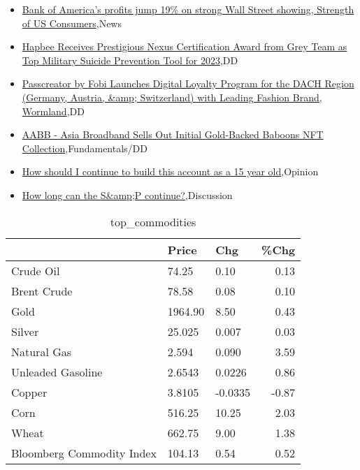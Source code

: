 \documentclass{article}%
\begin{document}
%
\begin{itemize}%
\item%
\href{https://reddit.com/r/wallstreetbets/comments/152vpia/bank\_of\_americas\_profits\_jump\_19\_on\_strong\_wall/}{Bank of America's profits jump 19\% on strong Wall Street showing, Strength of US Consumers},News%
\item%
\href{https://reddit.com/r/Baystreetbets/comments/1527l7h/hapbee\_receives\_prestigious\_nexus\_certification/}{Hapbee Receives Prestigious Nexus Certification Award from Grey Team as Top Military Suicide Prevention Tool for 2023},DD%
\item%
\href{https://reddit.com/r/Baystreetbets/comments/1523cgd/passcreator\_by\_fobi\_launches\_digital\_loyalty/}{Passcreator by Fobi Launches Digital Loyalty Program for the DACH Region (Germany, Austria, \&amp; Switzerland) with Leading Fashion Brand, Wormland},DD%
\item%
\href{https://reddit.com/r/StockMarket/comments/152x7kb/aabb\_asia\_broadband\_sells\_out\_initial\_goldbacked/}{AABB - Asia Broadband Sells Out Initial Gold-Backed Baboons NFT Collection},Fundamentals/DD%
\item%
\href{https://reddit.com/r/StockMarket/comments/152nt8v/how\_should\_i\_continue\_to\_build\_this\_account\_as\_a/}{How should I continue to build this account as a 15 year old},Opinion%
\item%
\href{https://reddit.com/r/StockMarket/comments/152lurx/how\_long\_can\_the\_sp\_continue/}{How long can the S\&amp;P continue?},Discussion%
\end{itemize}%


\begin{table}[htbp]%
\caption{top\_commodities}%
\centering%
\begin{adjustbox}{width=1\textwidth}%
\begin{tabular}{lllr}
\toprule
                          &   Price &     Chg &  \%Chg \\
\midrule
               Crude Oil  &   74.25 &    0.10 &  0.13 \\
             Brent Crude  &   78.58 &    0.08 &  0.10 \\
                    Gold  & 1964.90 &    8.50 &  0.43 \\
                  Silver  &  25.025 &   0.007 &  0.03 \\
             Natural Gas  &   2.594 &   0.090 &  3.59 \\
       Unleaded Gasoline  &  2.6543 &  0.0226 &  0.86 \\
                  Copper  &  3.8105 & -0.0335 & -0.87 \\
                    Corn  &  516.25 &   10.25 &  2.03 \\
                   Wheat  &  662.75 &    9.00 &  1.38 \\
Bloomberg Commodity Index &  104.13 &    0.54 &  0.52 \\
\bottomrule
\end{tabular}
%
\end{adjustbox}%
\end{table}
\end{document}
